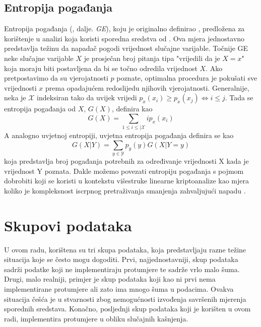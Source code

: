 \documentclass[times, utf8, diplomski]{fer}
\begin{document}
\subsection{Entropija pogađanja}

Entropija pogađanja (, dalje. \emph{GE}), koju je originalno definirao \cite{massey1994guessing}, predložena za korištenje u analizi koja koristi sporedna sredstva od \cite{kopf2007information}. Ova mjera jednostavno predstavlja težinu da napadač pogodi vrijednost slučajne varijable. Točnije GE neke slučajne varijable $X$ je prosječan broj pitanja tipa "vrijedili da je $X = x$" koja moraju biti postavljena da bi se točno odredila vrijednost $X$. Ako pretpostavimo da su vjerojatnosti $p$ poznate, optimalna procedura je pokušati sve vrijednosti $x$ prema opadajućem redoslijedu njihovih vjerojatnosti. Generalnije, neka je $\mathcal{X}$ indeksiran tako da uvijek vrijedi $p_x(x_i) \ge p_x(x_j) \iff i \le j$. Tada se entropija pogađanja od $X$, $G(X)$, definira kao
\begin{equation}
    G(X) = \sum_{1 \le i \le \vert \mathcal{X}} i p_x(x_i)
\end{equation}
A analogno uvjetnoj entropiji, uvjetna entropija pogađanja definira se kao
\begin{equation}
    G(X \vert Y) = \sum_{y \in \mathcal{Y}} p_y(y) G(X \vert Y = y)
\end{equation}
koja predstavlja broj pogađanja potrebnih za određivanje vrijednosti X kada je vrijednost Y poznata. Dakle možemo povezati entropiju pogađanja s pojmom dobrobiti koji se koristi u kontekstu višestruke linearne kriptoanalize kao mjera koliko je kompleksnost iscrpnog pretraživanja smanjenja zahvaljujući napadu \citep{standaert2009unified}.

\section{Skupovi podataka}
U ovom radu, korištena su tri skupa podataka, koja predstavljaju razne težine situacija koje se često mogu dogoditi. Prvi, najjednostavniji, skup podataka sadrži podatke koji ne implementiraju protumjere te sadrže vrlo malo šuma. Drugi, malo realniji, primjer je skup podataka koji kao ni prvi nema implementirane protumjere ali zato ima mnogo šuma u podacima. Ovakva situacija češća je u stvarnosti zbog nemogućnosti izvođenja savršenih mjerenja sporednih sredstava. Konačno, posljednji skup podataka koji je korišten u ovom radi, implementira protumjere u obliku slučajnih kašnjenja.
\end{document}
